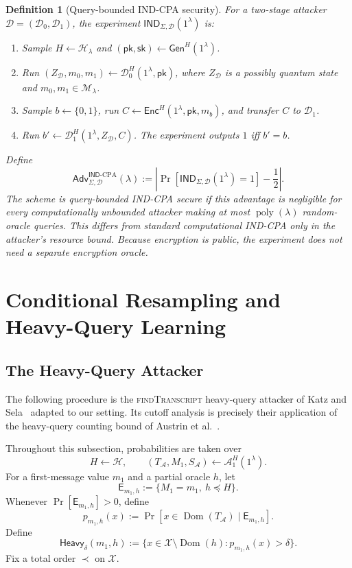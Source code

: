 \documentclass[11pt]{article}
\newtheorem{definition}[definition]{Definition}
\newcommand{\bits}{\{0,1\}}
\newcommand{\cA}{\mathcal{A}}
\newcommand{\cD}{\mathcal{D}}
\newcommand{\cH}{\mathcal{H}}
\newcommand{\cM}{\mathcal{M}}
\newcommand{\cX}{\mathcal{X}}
\newcommand{\Dom}{\operatorname{Dom}}
\newcommand{\poly}{\operatorname{poly}}
\newcommand{\Heavy}{\mathsf{Heavy}}
\newcommand{\Adv}{\mathsf{Adv}}
\newcommand{\Gen}{\mathsf{Gen}}
\newcommand{\Enc}{\mathsf{Enc}}
\newcommand{\IND}{\mathsf{IND}}
\newcommand{\pk}{\mathsf{pk}}
\newcommand{\sk}{\mathsf{sk}}
\begin{document}
\begin{definition}[Query-bounded IND-CPA security]\label{def:qpke-ind}
For a two-stage attacker \(\cD=(\cD_0,\cD_1)\), the experiment
\(\IND_{\Sigma,\cD}(1^\lambda)\) is:
\begin{enumerate}[leftmargin=2em]
  \item Sample \(H\leftarrow\cH_\lambda\) and
  \((\pk,\sk)\leftarrow\Gen^H(1^\lambda)\).
  \item Run
  \((Z_{\cD},m_0,m_1)\leftarrow\cD_0^H(1^\lambda,\pk)\), where
  \(Z_{\cD}\) is a possibly quantum state and
  \(m_0,m_1\in\cM_\lambda\).
  \item Sample \(b\leftarrow\bits\), run
  \(C\leftarrow\Enc^H(1^\lambda,\pk,m_b)\), and transfer \(C\) to
  \(\cD_1\).
  \item Run \(b'\leftarrow\cD_1^H(1^\lambda,Z_{\cD},C)\).  The experiment
  outputs \(1\) iff \(b'=b\).
\end{enumerate}
Define
\[
  \Adv^{\IND\text{-}\mathrm{CPA}}_{\Sigma,\cD}(\lambda)
  :=
  \left|\Pr[\IND_{\Sigma,\cD}(1^\lambda)=1]-\frac12\right|.
\]
The scheme is query-bounded IND-CPA secure if this advantage is negligible
for every computationally unbounded attacker making at most
\(\poly(\lambda)\) random-oracle queries. This differs from standard
computational IND-CPA only in the attacker's resource bound. Because
encryption is public, the experiment does not need a separate encryption
oracle.
\end{definition}

\section{Conditional Resampling and Heavy-Query Learning}\label{sec:resampling}

\subsection{The Heavy-Query Attacker}

The following procedure is the \textsc{findTranscript} heavy-query attacker
of Katz and Sela~\cite[Section~3 and Lemma~5]{KatzSela24} adapted to our setting. Its cutoff analysis is precisely
their application of the heavy-query counting bound of Austrin et
al.~\cite{AustrinEtAl22}.

Throughout this subsection, probabilities are taken over
\[
  H\leftarrow\cH,
  \qquad
  (T_{\cA},M_1,S_{\cA})\leftarrow\cA_1^H(1^\lambda).
\]
For a first-message value \(m_1\) and a partial oracle \(h\), let
\[
  \mathsf E_{m_1,h}:=\{M_1=m_1,\ h\preceq H\}.
\]
Whenever \(\Pr[\mathsf E_{m_1,h}]>0\), define
\begin{equation}\label{eq:p-heavy}
  p_{m_1,h}(x)
  :=
  \Pr[x\in\Dom(T_{\cA})\mid\mathsf E_{m_1,h}].
\end{equation}
Define
\[
  \Heavy_\delta(m_1,h)
  :=
  \{x\in\cX\setminus\Dom(h):p_{m_1,h}(x)>\delta\}.
\]
Fix a total order \(\prec\) on \(\cX\).
\end{document}
